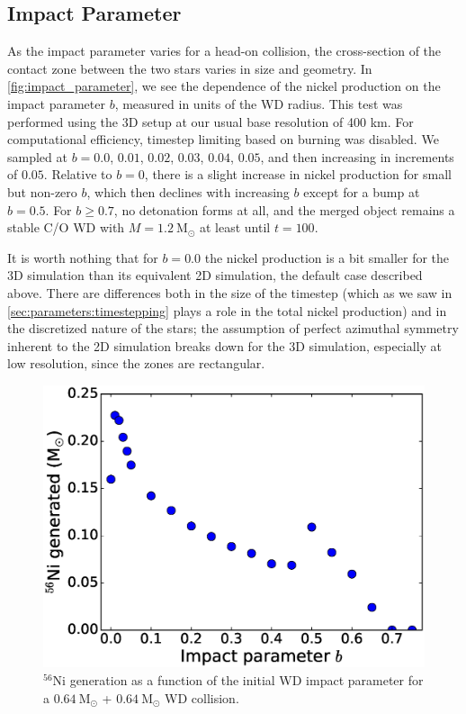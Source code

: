 \documentclass[twocolumn,numberedappendix]{../aastex6}
\newcommand{\msolar}{\mathrm{M}_\odot}
\begin{document}
\subsection{Impact Parameter}
\label{sec:parameters:impactparameter}

As the impact parameter varies for a head-on collision, the cross-section of the contact
zone between the two stars varies in size and geometry. In \autoref{fig:impact_parameter}, we
see the dependence of the nickel production on the impact parameter $b$, measured in units
of the WD radius. This test was performed using the 3D setup at our usual base resolution of
400 km. For computational efficiency, timestep limiting based on burning was disabled.
We sampled at $b = 0.0$, $0.01$, $0.02$, $0.03$, $0.04$, $0.05$, and then increasing
in increments of $0.05$. Relative to $b = 0$, there is a slight increase in nickel production for small
but non-zero $b$, which then declines with increasing $b$ except for a bump at $b = 0.5$.
For $b \ge 0.7$, no detonation forms at all, and the merged object remains a stable C/O WD
with $M = 1.2\ \msolar$ at least until $t = 100$.

It is worth nothing that for $b = 0.0$ the nickel production is a bit smaller for the 3D simulation
than its equivalent 2D simulation, the default case described above. There are differences both in
the size of the timestep (which as we saw in \autoref{sec:parameters:timestepping} plays a role in
the total nickel production) and in the discretized nature of the stars; the assumption of perfect
azimuthal symmetry inherent to the 2D simulation breaks down for the 3D simulation, especially at
low resolution, since the zones are rectangular.

\begin{figure}
  \centering
  \includegraphics[scale=0.425]{plots/impact_parameter}
  \caption[Nickel production dependence on the impact parameter]
          {$^{56}$Ni generation as a function of the initial WD impact parameter for
           a $0.64\ \msolar$ + $0.64\ \msolar$ WD collision.
           \label{fig:impact_parameter}}
\end{figure}
\end{document}
